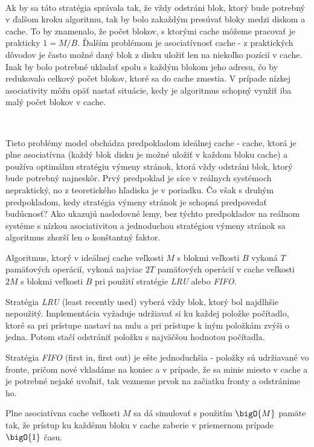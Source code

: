\

Ak by sa táto stratégia správala tak, že vždy odstráni blok, ktorý bude potrebný v ďalšom kroku algoritmu, tak by bolo zakaždým presúvať bloky medzi diskom a cache. To by znamenalo, že počet blokov, s ktorými cache môžeme pracovať je prakticky $1 = M/B$. Ďalším problémom je asociatívnosť cache - z praktických dôvodov je často možné daný blok z disku uložiť len na niekoľko pozícií v cache. Inak by bolo potrebné ukladať spolu s každým blokom jeho adresu, čo by redukovalo celkový počet blokov, ktoré sa do cache zmestia. V prípade nízkej asociativity môžu opäť nastať situácie, kedy je algoritmus schopný využiť iba malý počet blokov v cache.

\

Tieto problémy \obliv model obchádza predpokladom ideálnej cache - cache, ktorá je plne asociatívna (každý blok disku je možné uložiť v každom bloku cache) a používa optimálnu stratégiu výmeny stránok, ktorá vždy odstráni blok, ktorý bude potrebný najneskôr. Prvý predpoklad je síce v reálnych systémoch nepraktický, no z teoretického hľadiska je v poriadku. Čo však s druhým predpokladom, kedy stratégia výmeny stránok je schopná predpovedať budúcnosť? Ako ukazujú nasledovné lemy, bez týchto predpokladov na reálnom systéme s nízkou asociativitou a jednoduchou stratégiou výmeny stránok sa algoritmus zhorší len o konštantný faktor.

\begin{lema}
Algoritmus, ktorý v ideálnej cache veľkosti $M$ s blokmi veľkosti $B$ vykoná $T$ pamäťových operácií, vykoná najviac $2T$ pamäťových operácií v cache veľkosti $2M$ s blokmi veľkosti $B$ pri použití stratégie {\em LRU} alebo {\em FIFO}. \citep[Lemma 12]{FrigoLePr99}
\end{lema}

Stratégia {\em LRU} (least recently used) vyberá vždy blok, ktorý bol najdlhšie nepoužitý. Implementácia vyžaduje udržiavať si ku každej položke počítadlo, ktoré sa pri prístupe nastaví na nulu a pri prístupe k iným položkám zvýši o jedna. Potom stačí odstrániť položku s najväčšou hodnotou počítadla.

Stratégia {\em FIFO} (first in, first out) je ešte jednoduchšia - položky sú udržiavané vo fronte, pričom nové vkladáme na koniec a v prípade, že sa minie miesto v cache a je potrebné nejaké uvoľniť, tak vezmeme prvok na začiatku fronty a odstránime ho.

\begin{lema}
Plne asociatívna cache veľkosti $M$ sa dá simulovať s použitím $\bigO{M}$ pamäte tak, že prístup ku každému bloku v cache zaberie v priemernom prípade $\bigO{1}$ času. \citep[Lemma 16]{FrigoLePr99}
\end{lema}

